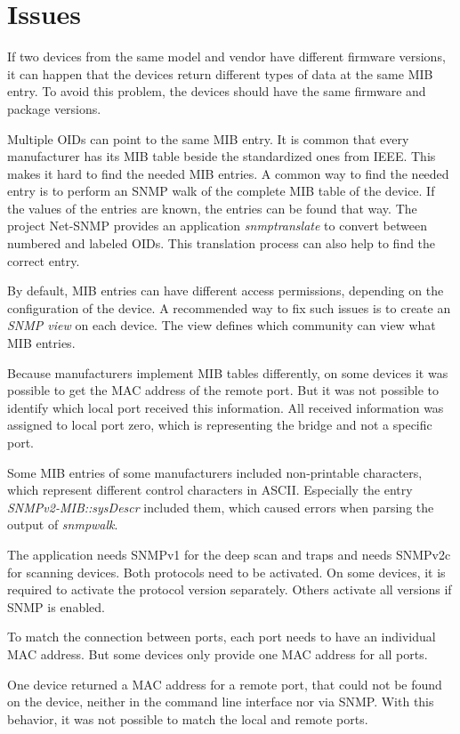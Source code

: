 \section{Issues}
\label{Section:CAF-Issues}

If two devices from the same model and vendor have different firmware versions, it can happen that the devices return different types of data at the same MIB entry. To avoid this problem, the devices should have the same firmware and package versions.

Multiple OIDs can point to the same MIB entry. It is common that every manufacturer has its MIB table beside the standardized ones from IEEE. This makes it hard to find the needed MIB entries. A common way to find the needed entry is to perform an SNMP walk of the complete MIB table of the device. If the values of the entries are known, the entries can be found that way. The project Net-SNMP provides an application \textit{snmptranslate} to convert between numbered and labeled OIDs. This translation process can also help to find the correct entry.

By default, MIB entries can have different access permissions, depending on the configuration of the device. A recommended way to fix such issues is to create an \textit{SNMP view} on each device. The view defines which community can view what MIB entries.

Because manufacturers implement MIB tables differently, on some devices it was possible to get the MAC address of the remote port. But it was not possible to identify which local port received this information. All received information was assigned to local port zero, which is representing the bridge and not a specific port.

Some MIB entries of some manufacturers included non-printable characters, which represent different control characters in ASCII. Especially the entry \textit{SNMPv2-MIB::sysDescr} included them, which caused errors when parsing the output of \textit{snmpwalk}.

The application needs SNMPv1 for the deep scan and traps and needs SNMPv2c for scanning devices. Both protocols need to be activated. On some devices, it is required to activate the protocol version separately. Others activate all versions if SNMP is enabled.

To match the connection between ports, each port needs to have an individual MAC address. But some devices only provide one MAC address for all ports.

One device returned a MAC address for a remote port, that could not be found on the device, neither in the command line interface nor via SNMP. With this behavior, it was not possible to match the local and remote ports.


